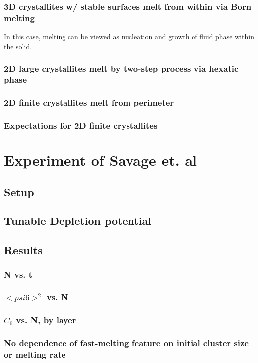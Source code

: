 \documentclass{umthesis}
\begin{document}
\subsubsection{3D crystallites w/ stable surfaces melt from within via Born melting}
\label{sec-1.1.2}

In this case, melting can be viewed as nucleation and growth of fluid phase within the solid.
\subsubsection{2D large crystallites melt by two-step process via hexatic phase}
\label{sec-1.1.3}
\subsubsection{2D finite crystallites melt from perimeter}
\label{sec-1.1.4}
\subsubsection{Expectations for 2D finite crystallites}
\label{sec-1.1.5}
\section{Experiment of Savage et. al}
\label{sec-1.2}
\subsection{Setup}
\label{sec-1.2.1}
\subsection{Tunable Depletion potential}
\label{sec-1.2.2}
\subsection{Results}
\label{sec-1.2.3}
\subsubsection{N vs. t}
\label{sec-1.2.4}
\subsubsection{$< psi6 >^2$ vs. N}
\label{sec-1.2.5}
\subsubsection{$C_6$ vs. N, by layer}
\label{sec-1.2.6}
\subsubsection{No dependence of fast-melting feature on initial cluster size or melting rate}
\label{sec-1.2.7}
\end{document}
